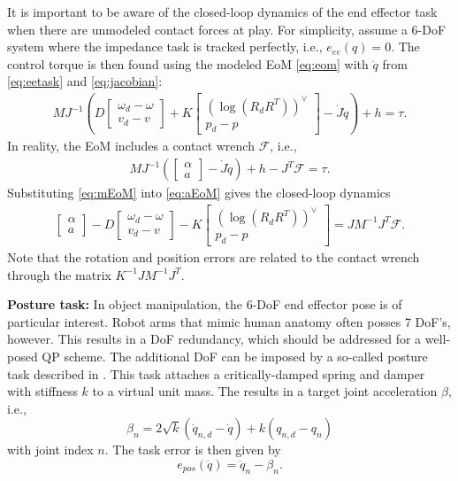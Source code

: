 \documentclass[a4paper, 10pt, conference]{ieeeconf}
\begin{document}
    It is important to be aware of the closed-loop dynamics of the end effector task when there are unmodeled contact forces at play. For simplicity, assume a 6-DoF system where the impedance task is tracked perfectly, i.e., $e_{ee}(q)=0$. The control torque is then found using the modeled EoM \eqref{eq:eom} with $\ddot{q}$ from \eqref{eq:eetask} and \eqref{eq:jacobian}:
     \begin{align} \label{eq:mEoM} MJ^{-1}
    \left(   
    D \begin{bmatrix} \omega_d - {}{\omega} \\ v_d - v \end{bmatrix}  + K \begin{bmatrix}(\log({R}_dR^T))^{\vee }  \\p_d - {p}  \end{bmatrix} -\dot{J}\dot{q}\right)+h =\tau.
    \end{align} In reality, the EoM includes a contact wrench $\mathcal{F}$, i.e., 
    \begin{align} \label{eq:aEoM} MJ^{-1} \left(
    \begin{bmatrix} \alpha \\ a \end{bmatrix}-\dot{J}\dot{q} \right ) +h -J^T\mathcal{F}=\tau.
    \end{align}
    Substituting \eqref{eq:mEoM} into \eqref{eq:aEoM} gives the closed-loop dynamics
    \begin{align} \label{eq:ee_closeloop} 
    \begin{bmatrix} \alpha \\ a \end{bmatrix}- D \begin{bmatrix} \omega_d - {}{\omega} \\ v_d - v \end{bmatrix}  - K \begin{bmatrix}(\log({R}_dR^T))^{\vee }  \\p_d - {p}  \end{bmatrix}=JM^{-1}J^T\mathcal{F}.
    \end{align}
    Note that the rotation and position errors are related to the contact wrench through the matrix $K^{-1}JM^{-1}J^T$.

    \textbf{Posture task:} In object manipulation, the 6-DoF end effector pose is of particular interest. Robot arms that mimic human anatomy often posses 7 DoF's, however. This results in a DoF redundancy, which should be addressed for a well-posed QP scheme. The additional DoF can be imposed by a so-called posture task described in \cite{cisnerosRobustHumanoidControl2018}. This task attaches a critically-damped spring and damper with stiffness $k$ to a virtual unit mass. The results in a target joint acceleration $\beta$, i.e.,
    \begin{equation} \label{eq:beta} \beta_n = 2\sqrt{k}(\dot{q}_{n,d}-\dot{q}) +k(q_{n,d}-q_n)
    \end{equation}
    with joint index $n$. The task error is then given by
    \begin{equation} \label{eq:e_pos} e_{pos}(\ddot{q}) = 
    \ddot{q}_n - \beta_n.
    \end{equation}
\end{document}
